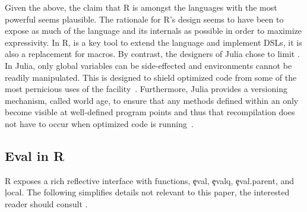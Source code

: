 \documentclass[review,screen,acmsmall,anonymous=true]{acmart}
\begin{document}
Given the above, the claim that R is amongst the languages with the most
powerful \eval seems plausible. The rationale for R's design seems to have been
to expose as much of the language and its internals as possible in order to
maximize expressivity. In R, \eval is a key tool to extend the language and
implement DSLs, it is also a replacement for macros. By contrast, the designers
of Julia chose to limit \eval. In Julia, only global variables can be
side-effected and environments cannot be readily manipulated. This is designed
to shield optimized code from some of the most pernicious uses of the
facility~\cite{oopsla18a}. Furthermore, Julia provides a versioning
mechanism, called world age, to ensure that any methods defined within an \eval
only become visible at well-defined program points and thus that recompilation
does not have to occur when optimized code is running~\cite{oopsla20a}.

\subsection{Eval in R}\label{sec:eval-in-r}

R exposes a rich reflective interface with functions, \c{eval},
\c{evalq}, \c{eval.parent}, and \c{local}. The following simplifies details not
relevant to this paper, the interested reader should consult \citet{hadley}.
\end{document}
